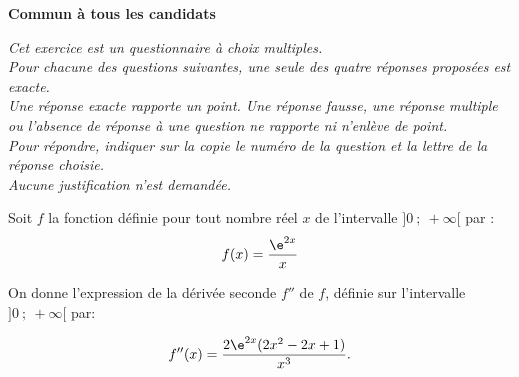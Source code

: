 
\textbf{Commun à tous les candidats}

\medskip


\emph{Cet exercice est un questionnaire à choix multiples.\\
 Pour chacune des questions suivantes, une seule des quatre réponses proposées est exacte.\\
 Une réponse exacte rapporte un point. Une réponse fausse, une réponse multiple ou l'absence de réponse à une question ne rapporte ni
n'enlève de point.\\
 Pour répondre, indiquer sur la copie le numéro de la question et la lettre de
la réponse choisie.\\ Aucune justification n'est demandée.}

\vspace{0.7cm}

Soit $f$ la fonction définie pour tout nombre réel $x$ de l'intervalle $]0~;~ +\infty[$ par :
\[ f(x) =\dfrac{\e^{2x}}{x}\]

On donne l'expression de la dérivée seconde $f''$ de $f$, définie sur l'intervalle $]0~;~ +\infty[$ par:

\[f''(x)=\dfrac {2 \e^{2x} (2x^2-2x+1)}{x^3}.\]


